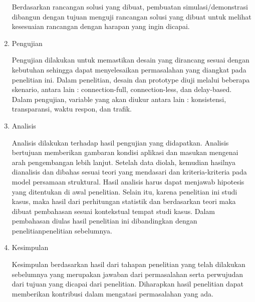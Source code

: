 \begin{enumerate}
Berdasarkan rancangan solusi yang dibuat, pembuatan simulasi/demonstrasi dibangun dengan tujuan menguji rancangan solusi yang dibuat untuk melihat kesesuaian rancangan dengan harapan yang ingin dicapai.
\item Pengujian

Pengujian dilakukan untuk memastikan desain yang dirancang sesuai dengan kebutuhan sehingga dapat menyelesaikan permasalahan yang diangkat pada penelitian ini. Dalam penelitian, desain dan prototype diuji melalui beberapa skenario, antara lain : connection-full, connection-less, dan delay-based. Dalam pengujian, variable yang akan diukur antara lain : konsistensi, transparansi, waktu respon, dan trafik.
\item Analisis

Analisis dilakukan terhadap hasil pengujian yang didapatkan. Analisis bertujuan memberikan gambaran kondisi aplikasi dan masukan mengenai arah pengembangan lebih lanjut. Setelah data diolah, kemudian hasilnya dianalisis dan dibahas sesuai teori yang mendasari dan kriteria-kriteria pada model persamaan struktural. Hasil analisis harus dapat menjawab hipotesis yang ditentukan di awal penelitian. Selain itu, karena penelitian ini studi kasus, maka hasil dari perhitungan statistik dan berdasarkan teori maka dibuat pembahasan sesuai kontekstual tempat studi kasus. Dalam pembahasan diulas hasil penelitian ini dibandingkan dengan penelitianpenelitian sebelumnya.
\item Kesimpulan

Kesimpulan berdasarkan hasil dari tahapan penelitian yang telah dilakukan sebelumnya yang merupakan jawaban dari permasalahan serta perwujudan dari tujuan yang dicapai dari penelitian. Diharapkan hasil penelitian dapat memberikan kontribusi dalam mengatasi permasalahan yang ada.
\end{enumerate}

